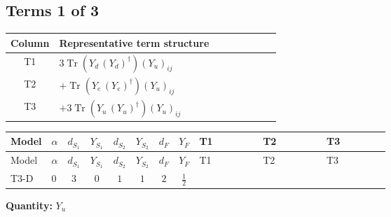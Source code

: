 \documentclass[8pt]{article}
\begin{document}
\begin{landscape}
\subsection*{Terms 1 of 3}
\begin{center}
\begin{tabular}{@{}c >{\raggedright\arraybackslash}p{0.82\linewidth}@{}}
\toprule
Column & Representative term structure \\
\midrule
T1 & \(\displaystyle 3 \operatorname{Tr}\!\left({Y_d}\,\left({Y_d}\right)^{\dagger}\right) \left({Y_u}\right)_{ij}\) \\
\midrule
T2 & \(\displaystyle +\operatorname{Tr}\!\left({Y_e}\,\left({Y_e}\right)^{\dagger}\right) \left({Y_u}\right)_{ij}\) \\
\midrule
T3 & \(\displaystyle +3 \operatorname{Tr}\!\left({Y_u}\,\left({Y_u}\right)^{\dagger}\right) \left({Y_u}\right)_{ij}\) \\
\midrule
\bottomrule
\end{tabular}
\end{center}
\smallskip
\tiny
\begin{longtable}{@{}llcccccc >{\raggedright\arraybackslash}p{0.21\linewidth} >{\raggedright\arraybackslash}p{0.21\linewidth} >{\raggedright\arraybackslash}p{0.21\linewidth}@{}}
\toprule
Model & $\alpha$ & $d_{S_1}$ & $Y_{S_1}$ & $d_{S_2}$ & $Y_{S_2}$ & $d_F$ & $Y_F$ & T1 & T2 & T3 \\
\midrule
\endfirsthead
\toprule
Model & $\alpha$ & $d_{S_1}$ & $Y_{S_1}$ & $d_{S_2}$ & $Y_{S_2}$ & $d_F$ & $Y_F$ & T1 & T2 & T3 \\
\midrule
\endhead
T3-D & $0$ & $3$ & $0$ & $1$ & $1$ & $2$ & $\frac{1}{2}$ & \scriptsize\adjustbox{max width=\linewidth}{$\begin{gathered} 3 \operatorname{Tr}\!\left({Y_d}\,\left({Y_d}\right)^{\dagger}\right) \left({Y_u}\right)_{ij}\end{gathered}$} & \scriptsize\adjustbox{max width=\linewidth}{$\begin{gathered} +\operatorname{Tr}\!\left({Y_e}\,\left({Y_e}\right)^{\dagger}\right) \left({Y_u}\right)_{ij}\end{gathered}$} & \scriptsize\adjustbox{max width=\linewidth}{$\begin{gathered} +3 \operatorname{Tr}\!\left({Y_u}\,\left({Y_u}\right)^{\dagger}\right) \left({Y_u}\right)_{ij}\end{gathered}$} \\
\midrule
\bottomrule
\end{longtable}
\clearpage
\noindent\textbf{Quantity: }$Y_u$\par\smallskip

\end{landscape}
\end{document}
